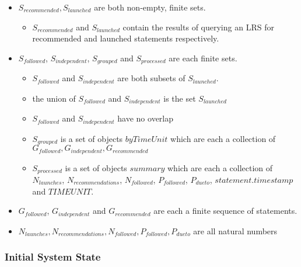 \documentclass{article}
\begin{document}
\begin{itemize}
\item $S_{recommended}, S_{launched}$ are both non-empty, finite sets.
  \begin{itemize}
  \item $S_{recommended}$ and $S_{launched}$ contain
    the results of querying an LRS for recommended and launched
    statements respectively.
  \end{itemize}
\item $S_{followed}$, $S_{independent}$, $S_{grouped}$ and $S_{processed}$ are each finite
  sets.
  \begin{itemize}
    \item $S_{followed}$ and $S_{independent}$ are both subsets of
      $S_{launched}$.
    \item the union of $S_{followed}$ and $S_{independent}$ is the set
      $S_{launched}$
    \item $S_{followed}$ and $S_{independent}$ have no overlap
    \item $S_{grouped}$ is a set of objects $byTimeUnit$ which are
      each a collection of $G_{followed}, G_{independent},
      G_{recommended}$
    \item $S_{processed}$ is a set of objects $summary$ which are each a
      collection of $N_{launches}$, $N_{recommendations}$,
      $N_{followed}$, $P_{followed}$, $P_{dueto}$,
      $statement.timestamp$ and $TIMEUNIT$.
    \end{itemize}
\item $G_{followed}$, $G_{independent}$ and $G_{recommended}$ are each a
  finite sequence of statements.
\item $N_{launches}, N_{recommendations}, N_{followed}, P_{followed},
  P_{dueto}$ are all natural numbers
\end{itemize}

\subsubsection{Initial System State}
\end{document}
